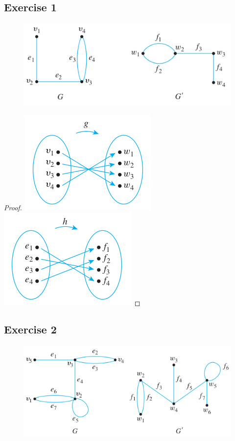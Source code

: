 \documentclass[14pt]{extarticle}
\begin{document}
\subsection{Exercise 1}
\begin{figure}[ht!]
    \centering
    \includegraphics[scale=0.55]{../images/10.3.1.png}
\end{figure}

\begin{proof}
    \includegraphics[scale=0.5]{../images/10.3.1.a.png}
    \includegraphics[scale=0.5]{../images/10.3.1.b.png}
\end{proof}

\subsection{Exercise 2}
\begin{figure}[ht!]
    \centering
    \includegraphics[scale=0.55]{../images/10.3.2.png}
\end{figure}
\end{document}
